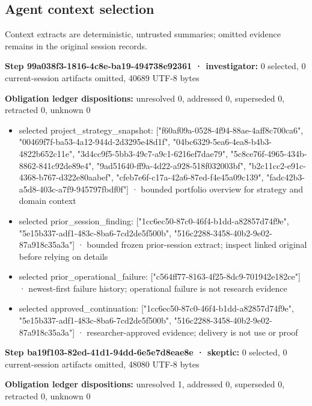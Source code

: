\documentclass[11pt]{article}
\begin{document}
\subsection{Agent context selection}
Context extracts are deterministic, untrusted summaries; omitted evidence remains in the original session records.\par
\textbf{Step 99a038f3-1816-4c8e-ba19-494738e92361 · investigator:} 0 selected, 0 current-session artifacts omitted, 40689 UTF-8 bytes\par
\textbf{Obligation ledger dispositions:} unresolved 0, addressed 0, superseded 0, retracted 0, unknown 0\par
\begin{itemize}
\item selected project\_strategy\_snapshot: ["f60af09a-0528-4f94-88ae-4aff8c700ca6", "00469f7f-ba53-4a12-944d-2d3295e48d1f", "04bc6329-5ea6-4ea8-b4b3-4822b652c11e", "3d4cc9f5-5bb3-49c7-a9c1-6216ef7dae79", "5c8ce76f-4965-434b-8862-841c92de89e4", "9ad51640-ff9a-4d22-a928-518f032003bf", "b2c11cc2-e91c-4368-b767-d322e80aabef", "cfeb7e6f-c17a-42a6-87ed-f4e45a09c139", "fadc42b3-a5d8-403c-a7f9-945797fbdf0f"] · bounded portfolio overview for strategy and domain context
\item selected prior\_session\_finding: ["1cc6ec50-87c0-46f4-b1dd-a82857d74f9e", "5e15b337-adf1-483c-8ba6-7cd2de5f500b", "516c2288-3458-40b2-9e02-87a918c35a3a"] · bounded frozen prior-session extract; inspect linked original before relying on details
\item selected prior\_operational\_failure: ["c564ff77-8163-4f25-8dc9-701942e182ce"] · newest-first failure history; operational failure is not research evidence
\item selected approved\_continuation: ["1cc6ec50-87c0-46f4-b1dd-a82857d74f9e", "5e15b337-adf1-483c-8ba6-7cd2de5f500b", "516c2288-3458-40b2-9e02-87a918c35a3a"] · researcher-approved evidence; delivery is not use or proof
\end{itemize}
\textbf{Step ba19f103-82ed-41d1-94dd-6e5e7d8eae8e · skeptic:} 0 selected, 0 current-session artifacts omitted, 48080 UTF-8 bytes\par
\textbf{Obligation ledger dispositions:} unresolved 1, addressed 0, superseded 0, retracted 0, unknown 0\par
\end{document}
